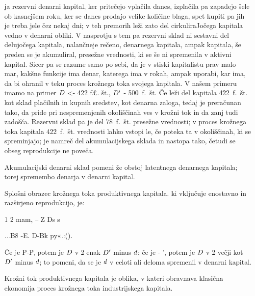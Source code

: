 \documentclass[kapital_02.tex]{subfiles}
\begin{document}
 ja rezervni denarni kapital, ker pritečejo vplačila danes, izplačila pa zapadejo šele ob kasnejšem roku, ker se danes prodajo velike količine blaga, spet kupiti pa jih je treba jele čez nekaj dni; v teh premorih leži zato del cirkuliraJočega kapitala vedno v denarni obliki. V nasprotju s tem pa rezervni sklad ni sestavni del delujočega kapitala, nalančneje rečeno, denarnega kapitala, ampak kapitala, še preden se je akumuliral, presežne vrednosti, ki se še ni spremenila v aktivni kapital. Sicer pa se razume samo po sebi, da je v stiski kapitalistu prav malo mar, kakšne funkcije ima denar, katerega ima v rokah, ampak uporabi, kar ima, da bi ohranil v teku proces krožnega toka svojega kapitala. V našem primeru imamo na primer \( D \) <- 422 f£. št., \( D' \) - 500~f.~št. Če leži del kapitala 422~f.~št. kot sklad plačilnih in kupnih sredstev, kot denarna zaloga, tedaj je preračunan tako, da pride pri nespremenjenih okoliščinah ves v krožni tok in da zanj tudi zadošča. Rezervni sklad pa je del 78~f.~št. presežne vrednosti; v proces krožnega toka kapitala 422~f.~št. vrednosti lahko vstopi le, če poteka ta v okoliščinah, ki se spreminjajo; je namreč del akumulacijskega sklada in nastopa tako, četudi se obseg reprodukcije ne poveča.

Akumulacijski denarni sklad pomeni že obstoj latentnega denarnega kapitala; torej spremembo denarja v denarni kapital.

Splošni obrazec krožnega toka produktivnega kapitala. ki vključuje enostavno in razširjeno reprodukcijo, je:

1 2 mam, -- Z Ds s

\KPEP...B8 -E. D-Bk py«.:\KPEP (\KPEP).

Če je P-P, potem je \( D \) v 2 enak \( D' \) minus \( d \); če je \KPEP - \KPEP', potem je \( D \) v 2 večji kot \( D' \) minus \( d \); to pomeni, da se je \( d \) v celoti ali deloma spremenil v denarni kapital.

Krožni tok produktivnega kapitala je oblika, v kateri obravnava klasična ekonomija proces krožnega toka industrijskega kapitala.
\end{document}
